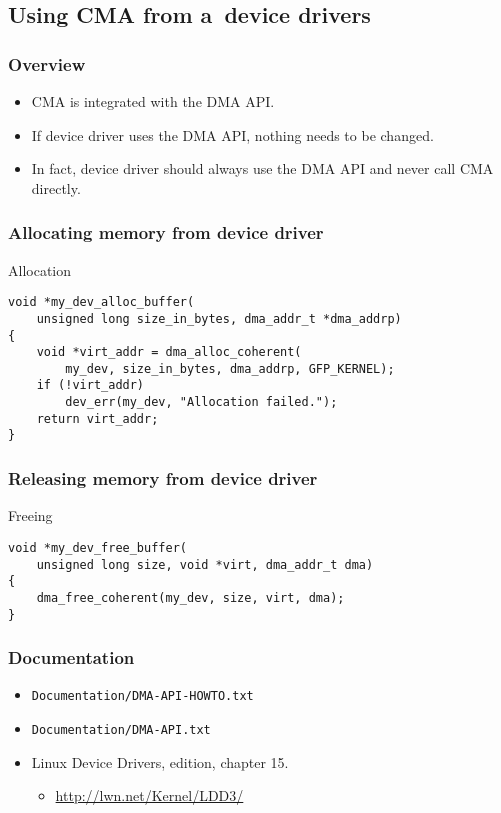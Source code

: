 \subsection{Using CMA from a~device drivers}

\begin{frame}
  \frametitle{Overview}

  \begin{itemize}
  \item CMA is integrated with the DMA API.
  \item If device driver uses the DMA API, nothing needs to be changed.
  \item In fact, device driver should always use the DMA API and never
    call CMA directly.
  \end{itemize}
\end{frame}

\begin{frame}[fragile]
  \frametitle{Allocating memory from device driver}

  \begin{block}{Allocation}
\begin{lstlisting}
void *my_dev_alloc_buffer(
    unsigned long size_in_bytes, dma_addr_t *dma_addrp)
{
    void *virt_addr = dma_alloc_coherent(
        my_dev, size_in_bytes, dma_addrp, GFP_KERNEL);
    if (!virt_addr)
        dev_err(my_dev, "Allocation failed.");
    return virt_addr;
}
\end{lstlisting}
  \end{block}

\end{frame}

\begin{frame}[fragile]
  \frametitle{Releasing memory from device driver}

  \begin{block}{Freeing}
\begin{lstlisting}
void *my_dev_free_buffer(
    unsigned long size, void *virt, dma_addr_t dma)
{
    dma_free_coherent(my_dev, size, virt, dma);
}
\end{lstlisting}
  \end{block}
\end{frame}

\begin{frame}
  \frametitle{Documentation}

  \begin{itemize}
  \item \lstinline|Documentation/DMA-API-HOWTO.txt|
  \item \lstinline|Documentation/DMA-API.txt|
  \item Linux Device Drivers,  edition, chapter 15.
    \begin{itemize}
    \item \url{http://lwn.net/Kernel/LDD3/}
    \end{itemize}
  \end{itemize}
\end{frame}
